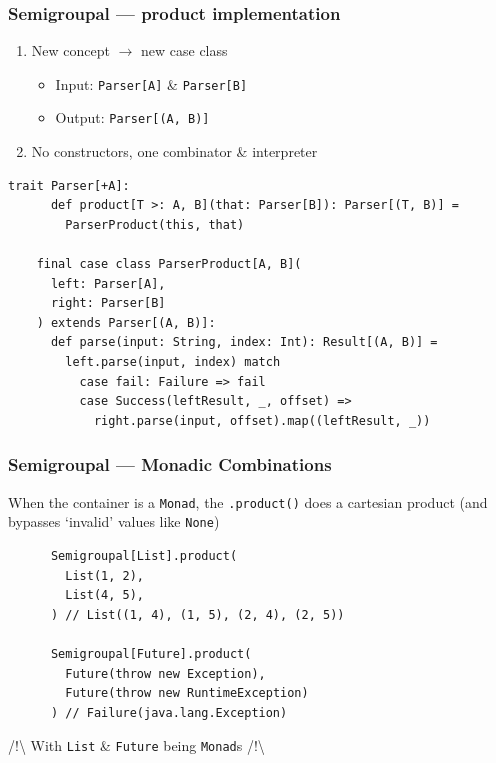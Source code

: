 \begin{frame}[fragile]
  \frametitle{Semigroupal --- product implementation}

  \begin{enumerate}
    \item New concept \({\rightarrow}\) new case class
          \begin{itemize}
            \item Input: \texttt{Parser[A]} \& \texttt{Parser[B]}
            \item Output: \texttt{Parser[(A, B)]}
          \end{itemize}
    \item No constructors, one combinator \& interpreter
  \end{enumerate}

  \begin{lstlisting}[gobble=4]
    trait Parser[+A]:
      def product[T >: A, B](that: Parser[B]): Parser[(T, B)] =
        ParserProduct(this, that)

    final case class ParserProduct[A, B](
      left: Parser[A],
      right: Parser[B]
    ) extends Parser[(A, B)]:
      def parse(input: String, index: Int): Result[(A, B)] =
        left.parse(input, index) match
          case fail: Failure => fail
          case Success(leftResult, _, offset) =>
            right.parse(input, offset).map((leftResult, _))
  \end{lstlisting}
\end{frame}

\begin{frame}[fragile]
  \frametitle{Semigroupal --- Monadic Combinations}

  When the container is a \texttt{Monad}, the \texttt{.product()} does a cartesian product (and bypasses `invalid' values like \texttt{None})

  \begin{example}
    \begin{lstlisting}
      Semigroupal[List].product(
        List(1, 2),
        List(4, 5),
      ) // List((1, 4), (1, 5), (2, 4), (2, 5))
      
      Semigroupal[Future].product(
        Future(throw new Exception),
        Future(throw new RuntimeException)
      ) // Failure(java.lang.Exception)
    \end{lstlisting}
  \end{example}
  /!\textbackslash{} With \texttt{List} \& \texttt{Future} being \texttt{Monad}s /!\textbackslash{}
\end{frame}


